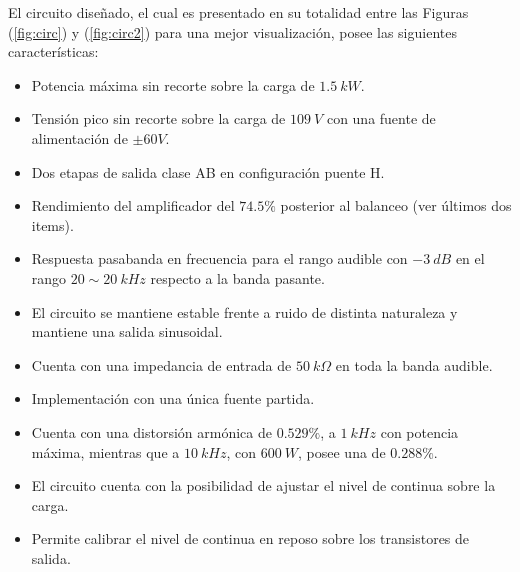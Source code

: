 
El circuito diseñado, el cual es presentado en su totalidad entre las Figuras (\ref{fig:circ}) y (\ref{fig:circ2}) para una mejor visualización, posee las siguientes características:
\begin{itemize}
\item Potencia máxima sin recorte sobre la carga de $1.5 \ kW$.
\item Tensión pico sin recorte sobre la carga de $109 \ V$ con una fuente de alimentación de $\pm 60V$.
\item Dos etapas de salida clase AB en configuración puente H.
\item Rendimiento del amplificador del $74.5\%$ posterior al balanceo (ver últimos dos items).
\item Respuesta pasabanda en frecuencia para el rango audible con $-3 \ dB$ en el rango $20 \sim 20 \ kHz$ respecto a la banda pasante.
\item El circuito se mantiene estable frente a ruido de distinta naturaleza y mantiene una salida sinusoidal.
\item Cuenta con una impedancia de entrada de $50 \ k\Omega$ en toda la banda audible.
\item Implementación con una única fuente partida.
\item Cuenta con una distorsión armónica de $0.529 \%$, a $1 \ kHz$ con potencia máxima, mientras que a $10 \ kHz$, con $600 \ W$, posee una de $0.288\%$.
\item El circuito cuenta con la posibilidad de ajustar el nivel de continua sobre la carga.
\item Permite calibrar el nivel de continua en reposo sobre los transistores de salida.
\end{itemize}

